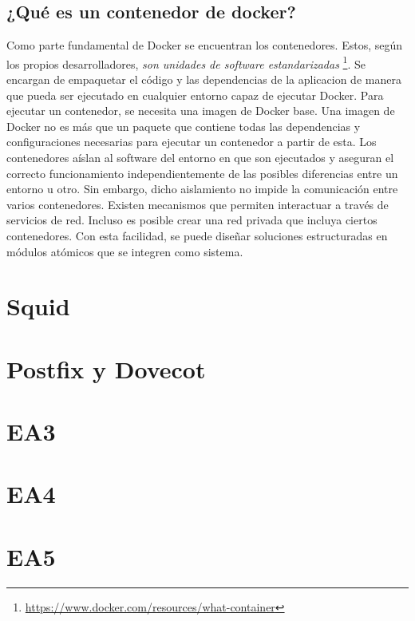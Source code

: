 \subsection{¿Qué es un contenedor de docker?}

Como parte fundamental de Docker se encuentran los contenedores. Estos, según los propios
desarrolladores, \textit{son unidades de software estandarizadas} \footnote{
\url{https://www.docker.com/resources/what-container}}. Se encargan de empaquetar
el código y las dependencias de la aplicacion de manera que pueda ser ejecutado en cualquier 
entorno capaz de ejecutar Docker. Para ejecutar un contenedor, se necesita una imagen de Docker 
base. Una imagen de Docker no es más que un paquete que contiene todas las dependencias y 
configuraciones necesarias para ejecutar un contenedor a partir de esta. Los contenedores aíslan
al software del entorno en que son ejecutados y aseguran el correcto funcionamiento 
independientemente de las posibles diferencias entre un entorno u otro. Sin embargo, dicho
aislamiento no impide la comunicación entre varios contenedores. Existen mecanismos que permiten
interactuar a través de servicios de red. Incluso es posible crear una red privada que incluya
ciertos contenedores. Con esta facilidad, se puede diseñar soluciones estructuradas en módulos
atómicos que se integren como sistema.

\section{Squid}

\section{Postfix y Dovecot}


\section{EA3}
\section{EA4}
\section{EA5}
